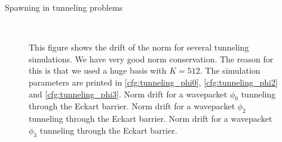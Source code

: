 \begin{chapter}{Spawning in tunneling problems}
\begin{figure}[h!]
  \centering
   \\
  \caption[Norm drift for some tunneling wavepackets]{
  This figure shows the drift of the norm for several tunneling simulations. We have very good
  norm conservation. The reason for this is that we used a huge basis with $K=512$.
  The simulation parameters are printed in \ref{cfg:tunneling_phi0}, \ref{cfg:tunneling_phi2} and \ref{cfg:tunneling_phi3}.
   Norm drift for a wavepacket $\phi_0$ tunneling through the Eckart barrier.
   Norm drift for a wavepacket $\phi_2$ tunneling through the Eckart barrier.
   Norm drift for a wavepacket $\phi_3$ tunneling through the Eckart barrier.
  \label{fig:tunnel_norms}
  }
\end{figure}



\end{chapter}
